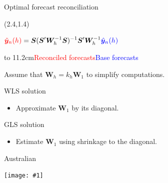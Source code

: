 \documentclass[14pt]{beamer}
\def\fullheight#1{\vspace*{0.1cm}\par\centerline{\texttt{[image: \#1]}}}
\def\by{\bm{y}}
\def\bS{\bm{S}}
\def\bSigma{\bm{W}}
\begin{document}
\begin{frame}{Optimal forecast reconciliation}


\begin{textblock}{8}(2.4,1.4)
\begin{block}{}
\centerline{$\displaystyle\textcolor{red}{\tilde{\by}_{n}(h)}
=\bS(\bS'\bSigma^{-1}_{h}\bS)^{-1}\bS'\bSigma^{-1}_{h}\textcolor{blue}{\hat{\by}_{n}(h)}$}
\end{block}\end{textblock}\vspace*{1.3cm}

\hspace*{-0.2cm}\hbox to 11.2cm{\textcolor{red}{Reconciled forecasts}\hfill\textcolor{blue}{Base forecasts}}
\pause\vspace*{-0.4cm}

Assume that $\bSigma_h =k_h \bSigma_1$ to simplify computations.

\pause

\begin{block}{WLS solution}
\begin{itemize}
\item Approximate $\bSigma_1$ by its diagonal.
\end{itemize}
\end{block}

\pause

\begin{block}{GLS solution}
\begin{itemize}
\item Estimate $\bSigma_1$ using shrinkage to the diagonal.
\end{itemize}
\end{block}

\vspace*{10cm}

\end{frame}




\begin{frame}{Australian }
\fullheight{regions1_with_labels}


\end{frame}
\end{document}
